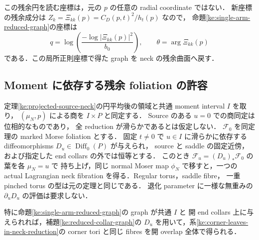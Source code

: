 この残余円を読む座標は，元の $p$ の任意の radial coordinate ではない．
新座標の残余成分は
$Z_k=\Xi_{kk}(p)=C_D(p,t)^2/h_t(p)$ なので，
命題\ref{ke:single-arm-reduced-graph}の座標は
\[
 q=\log\!\left(\frac{-\log|\Xi_{kk}(p)|^2}{b_0}\right),
 \qquad \theta=\arg\Xi_{kk}(p)
\]
である．この局所正則座標で得た graph を neck の残余曲面へ戻す．

\subsection{Moment に依存する残余 foliation の許容}

\begin{lemma}
\label{ke:moment-dependent-neck-foliation}
定理\ref{ke:projected-source-neck}の円平均後の領域と共通 moment interval $I$ を取り，
$(\mu_N,p)$ による商を $I\times P$ と同定する．
Source のある $u=0$ での商同定は位相的なものであり，
全 reduction が滑らかであるとは仮定しない．
$\mathcal F_0$ を同定理の marked Morse foliation とする．
固定 $t\ne0$ で $u\in I$ に滑らかに依存する diffeomorphisms
$D_u\in\operatorname{Diff}_0(P)$ が与えられ，
source と saddle の固定近傍，および指定した end collars の外では恒等とする．
このとき $\mathcal F_u=(D_u)_*\mathcal F_0$ の葉を各 $\mu_N=u$ で
持ち上げ，同じ normal Moser map $\phi_N$ で移すと，一つの actual
Lagrangian neck fibration を得る．Regular torus，saddle fibre，
一重 pinched torus の型は元の定理と同じである．
退化 parameter に一様な無重みの $\partial_uD_u$ の評価は要求しない．

特に命題\ref{ke:single-arm-reduced-graph}の graph が共通 $I$ と
開 end collars 上に与えられれば，補題\ref{ke:reduced-collar-graph}の
$D_u$ を用いて，系\ref{ke:corner-leaves-in-neck-reduction}の
corner tori と同じ fibres を開 overlap 全体で得られる．
\end{lemma}
